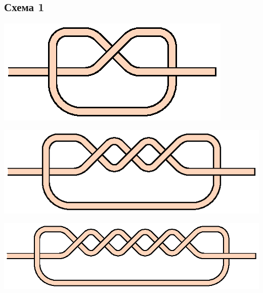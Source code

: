 \subsection{Схема 1}
\graphicspath{{\currentpath}}

\includegraphics{images/s-01-a0.eps}

\includegraphics{images/s-01-a1.eps}

\includegraphics{images/s-01-a2.eps}